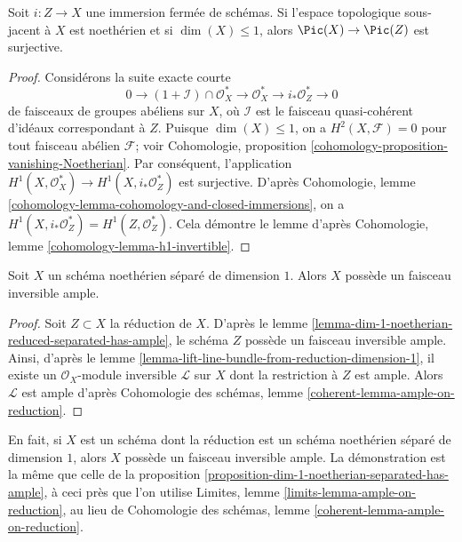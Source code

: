 \begin{lemma}
\label{lemma-lift-line-bundle-from-reduction-dimension-1}
Soit $i : Z \to X$ une immersion fermée de schémas.
Si l'espace topologique sous-jacent à $X$ est noethérien et si
$\dim(X) \leq 1$, alors $\Pic(X) \to \Pic(Z)$ est surjective.
\end{lemma}

\begin{proof}
Considérons la suite exacte courte
$$
0 \to (1 + \mathcal{I}) \cap \mathcal{O}_X^* \to
\mathcal{O}^*_X \to i_*\mathcal{O}^*_Z \to 0
$$
de faisceaux de groupes abéliens sur $X$, où $\mathcal{I}$
est le faisceau quasi-cohérent d'idéaux correspondant à $Z$.
Puisque $\dim(X) \leq 1$, on a $H^2(X, \mathcal{F}) = 0$
pour tout faisceau abélien $\mathcal{F}$; voir
Cohomologie, proposition \ref{cohomology-proposition-vanishing-Noetherian}.
Par conséquent, l'application $H^1(X, \mathcal{O}^*_X) \to H^1(X, i_*\mathcal{O}_Z^*)$
est surjective. D'après
Cohomologie, lemme \ref{cohomology-lemma-cohomology-and-closed-immersions},
on a $H^1(X, i_*\mathcal{O}_Z^*) = H^1(Z, \mathcal{O}_Z^*)$.
Cela démontre le lemme d'après
Cohomologie, lemme \ref{cohomology-lemma-h1-invertible}.
\end{proof}

\begin{proposition}
\label{proposition-dim-1-noetherian-separated-has-ample}
Soit $X$ un schéma noethérien séparé de dimension $1$.
Alors $X$ possède un faisceau inversible ample.
\end{proposition}

\begin{proof}
Soit $Z \subset X$ la réduction de $X$. D'après le
lemme \ref{lemma-dim-1-noetherian-reduced-separated-has-ample},
le schéma $Z$ possède un faisceau inversible ample.
Ainsi, d'après le lemme \ref{lemma-lift-line-bundle-from-reduction-dimension-1},
il existe un $\mathcal{O}_X$-module inversible $\mathcal{L}$
sur $X$ dont la restriction à $Z$ est ample.
Alors $\mathcal{L}$ est ample d'après
Cohomologie des schémas, lemme \ref{coherent-lemma-ample-on-reduction}.
\end{proof}

\begin{remark}
\label{remark-useless-generalization}
En fait, si $X$ est un schéma dont la réduction est un schéma noethérien
séparé de dimension $1$, alors $X$ possède un faisceau inversible
ample. La démonstration est la même que celle de la
proposition \ref{proposition-dim-1-noetherian-separated-has-ample},
à ceci près que l'on utilise
Limites, lemme \ref{limits-lemma-ample-on-reduction},
au lieu de
Cohomologie des schémas, lemme \ref{coherent-lemma-ample-on-reduction}.
\end{remark}

